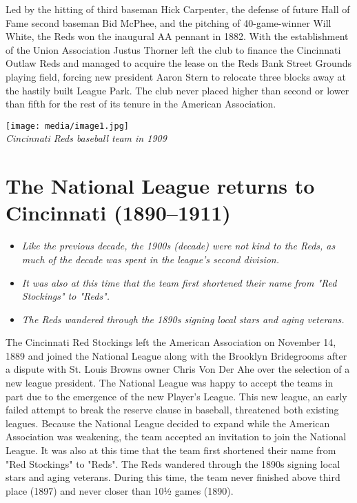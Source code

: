 Led by the hitting of third baseman Hick Carpenter, the defense of
future Hall of Fame second baseman Bid McPhee, and the pitching of
40-game-winner Will White, the Reds won the inaugural AA pennant in
1882. With the establishment of the Union Association Justus Thorner
left the club to finance the Cincinnati Outlaw Reds and managed to
acquire the lease on the Reds Bank Street Grounds playing field, forcing
new president Aaron Stern to relocate three blocks away at the hastily
built League Park. The club never placed higher than second or lower
than fifth for the rest of its tenure in the American Association.

\texttt{[image: media/image1.jpg]}\\
\emph{Cincinnati Reds baseball team in 1909}

\section{The National League returns to Cincinnati
(1890--1911)}\label{the-national-league-returns-to-cincinnati-18901911}

\begin{itemize}
\item
  \emph{Like the previous decade, the 1900s (decade) were not kind to
  the Reds, as much of the decade was spent in the league's second
  division.}
\item
  \emph{It was also at this time that the team first shortened their
  name from "Red Stockings" to "Reds".}
\item
  \emph{The Reds wandered through the 1890s signing local stars and
  aging veterans.}
\end{itemize}

The Cincinnati Red Stockings left the American Association on November
14, 1889 and joined the National League along with the Brooklyn
Bridegrooms after a dispute with St. Louis Browns owner Chris Von Der
Ahe over the selection of a new league president. The National League
was happy to accept the teams in part due to the emergence of the new
Player's League. This new league, an early failed attempt to break the
reserve clause in baseball, threatened both existing leagues. Because
the National League decided to expand while the American Association was
weakening, the team accepted an invitation to join the National League.
It was also at this time that the team first shortened their name from
"Red Stockings" to "Reds". The Reds wandered through the 1890s signing
local stars and aging veterans. During this time, the team never
finished above third place (1897) and never closer than 10​1⁄2 games
(1890).

